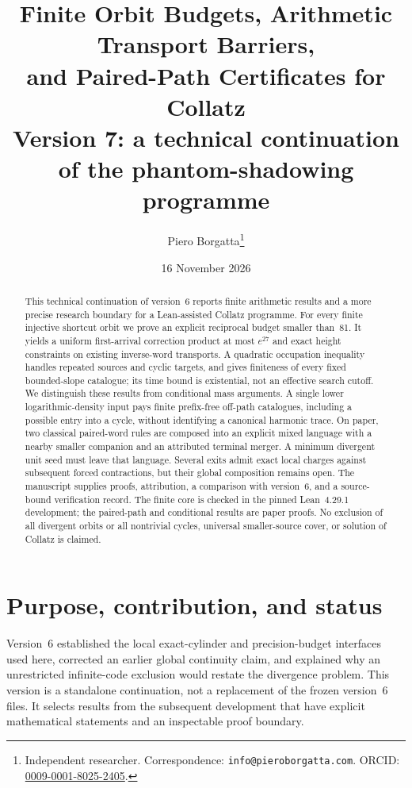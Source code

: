 \documentclass[11pt,a4paper]{article}
\title{Finite Orbit Budgets, Arithmetic Transport Barriers,\\
and Paired-Path Certificates for Collatz\\[0.4em]
\large Version 7: a technical continuation of the phantom-shadowing programme}
\author{Piero Borgatta\thanks{Independent researcher.
Correspondence: \texttt{info@pieroborgatta.com}.
ORCID: \href{https://orcid.org/0009-0001-8025-2405}{0009-0001-8025-2405}.}}
\date{16 November 2026}
\theoremstyle{definition}
\begin{document}
\maketitle

\begin{abstract}
This technical continuation of version~6 reports finite arithmetic results
and a more precise research boundary for a Lean-assisted Collatz programme.
For every finite injective shortcut orbit we prove an explicit reciprocal
budget smaller than~81. It yields a uniform first-arrival correction product
at most $e^{27}$ and exact height constraints on existing inverse-word
transports. A quadratic occupation inequality handles repeated sources and
cyclic targets, and gives finiteness of every fixed bounded-slope catalogue;
its time bound is existential, not an effective search cutoff.
We distinguish these results from conditional mass arguments. A single
lower logarithmic-density input pays finite prefix-free off-path catalogues,
including a possible entry into a cycle, without identifying a canonical
harmonic trace. On paper, two classical paired-word rules are composed
into an explicit mixed language with a nearby smaller companion and an
attributed terminal merger. A minimum divergent unit seed must leave that
language. Several exits admit exact local charges against subsequent
forced contractions, but their global composition remains open.
The manuscript supplies proofs, attribution, a comparison with version~6,
and a source-bound verification record. The finite core is checked in
the pinned Lean~4.29.1 development; the paired-path and conditional results
are paper proofs. No exclusion of all divergent orbits or all nontrivial
cycles, universal smaller-source cover, or solution of Collatz is claimed.
\end{abstract}

\begingroup\small\tableofcontents\endgroup

\section{Purpose, contribution, and status}
\label{sec:scope}
Version~6 \cite{borgatta_v6} established the local exact-cylinder and
precision-budget interfaces used here, corrected an earlier global
continuity claim, and explained why an unrestricted infinite-code
exclusion would restate the divergence problem. This version is a
standalone continuation, not a replacement of the frozen version~6 files.
It selects results from the subsequent development that have explicit
mathematical statements and an inspectable proof boundary.
\end{document}
